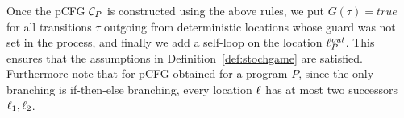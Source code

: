 Once the pCFG $\mathcal{C}_P$ is constructed using the above rules, we put
$G(\tau)=\textit{true}$ for all transitions $\tau$ outgoing from deterministic
locations whose guard was not set in the process, and finally we add a self-loop
on the location $\ell^{\mathit{out}}_P$. This ensures that the assumptions in
Definition~\ref{def:stochgame} are satisfied.
Furthermore note that for pCFG obtained for a program $P$, since the only
branching is if-then-else branching, every location $\ell$ has at most two
successors $\ell_1,\ell_2$.



